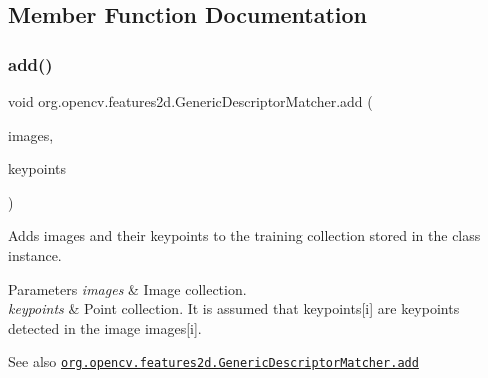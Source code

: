 \subsection{Member Function Documentation}
\mbox{\label{classorg_1_1opencv_1_1features2d_1_1_generic_descriptor_matcher_ad0e0a234636c370c74fdd4086ac5c716}} 
\subsubsection{\texorpdfstring{add()}{add()}}
{\footnotesize\ttfamily void org.\+opencv.\+features2d.\+Generic\+Descriptor\+Matcher.\+add (\begin{DoxyParamCaption}\item[{List$<$ \mbox{\hyperlink{classorg_1_1opencv_1_1core_1_1_mat}{Mat}} $>$}]{images,  }\item[{List$<$ \mbox{\hyperlink{classorg_1_1opencv_1_1core_1_1_mat_of_key_point}{Mat\+Of\+Key\+Point}} $>$}]{keypoints }\end{DoxyParamCaption})}

Adds images and their keypoints to the training collection stored in the class instance.


\begin{DoxyParams}{Parameters}
{\em images} & Image collection. \\
\hline
{\em keypoints} & Point collection. It is assumed that {\ttfamily keypoints\mbox{[}i\mbox{]}} are keypoints detected in the image {\ttfamily images\mbox{[}i\mbox{]}}.\\
\hline
\end{DoxyParams}
\begin{DoxySeeAlso}{See also}
\href{http://docs.opencv.org/modules/features2d/doc/common_interfaces_of_generic_descriptor_matchers.html#genericdescriptormatcher-add}{\tt org.\+opencv.\+features2d.\+Generic\+Descriptor\+Matcher.\+add} 
\end{DoxySeeAlso}
\mbox{\label{classorg_1_1opencv_1_1features2d_1_1_generic_descriptor_matcher_aad6739fde6c8aea642a80de25d498ce1}} 
